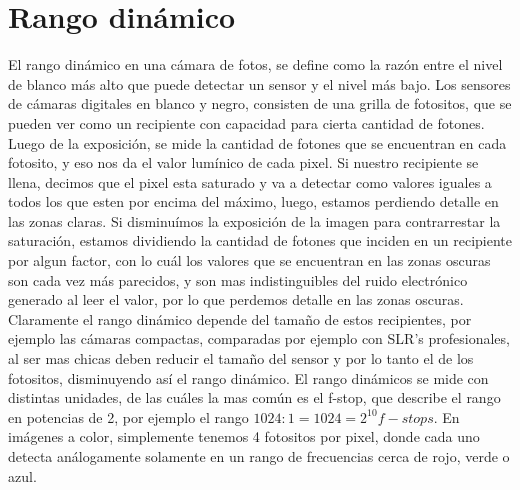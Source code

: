 \documentclass[a4paper,10pt]{article}
\begin{document}
    \section{Rango dinámico}

        El rango dinámico en una cámara de fotos, se define como la razón entre el nivel de blanco más alto que puede detectar un sensor y el nivel más bajo. Los sensores de cámaras digitales en blanco y negro, consisten de una grilla de fotositos, que se pueden ver como un recipiente con capacidad para cierta cantidad de fotones. Luego de la exposición, se mide la cantidad de fotones que se encuentran en cada fotosito, y eso nos da el valor lumínico de cada pixel. Si nuestro recipiente se llena, decimos que el pixel esta saturado y va a detectar como valores iguales a todos los que esten por encima del máximo, luego, estamos perdiendo detalle en las zonas claras. Si disminuímos la exposición de la imagen para contrarrestar la saturación, estamos dividiendo la cantidad de fotones que inciden en un recipiente por algun factor, con lo cuál los valores que se encuentran en las zonas oscuras son cada vez más parecidos, y son mas indistinguibles del ruido electrónico generado al leer el valor, por lo que perdemos detalle en las zonas oscuras. Claramente el rango dinámico depende del tamaño de estos recipientes, por ejemplo las cámaras compactas, comparadas por ejemplo con SLR's profesionales, al ser mas chicas deben reducir el tamaño del sensor y por lo tanto el de los fotositos, disminuyendo así el rango dinámico. El rango dinámicos se mide con distintas unidades, de las cuáles la mas común es el f-stop, que describe el rango en potencias de 2, por ejemplo el rango $1024:1 = 1024 = 2^{10} f-stops$.
        En imágenes a color, simplemente tenemos 4 fotositos por pixel, donde cada uno detecta análogamente solamente en un rango de frecuencias cerca de rojo, verde o azul. 

    
    
\end{document}
